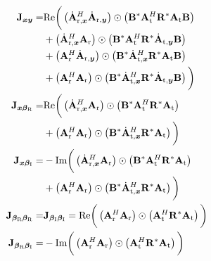 \documentclass[10pt,journal,twocolumn]{IEEEtran}
\begin{document}
\begin{subequations}\label{partial_derivative}
\begin{align}
\mathbf{J}_{\bm{x}\bm{y}}=&\text{Re}\bigg(\left(\dot{\mathbf{A}}^H_{\text{r},\bm{x}}\dot{\mathbf{A}}_{\text{r},\bm{y}}\right)\odot\left(\mathbf{B}^*\mathbf{A}^H_\text{t}\mathbf{R}^*\mathbf{A}_\text{t}\mathbf{B}\right)\notag\\
&+\left(\dot{\mathbf{A}}^H_{\text{r},\bm{x}}\mathbf{A}_{\text{r}}\right)\odot\left(\mathbf{B}^*\mathbf{A}^H_\text{t}\mathbf{R}^*\dot{\mathbf{A}}_{\text{t},\bm{y}}\mathbf{B}\right)\notag\\
&+\left(\mathbf{A}^H_{\text{r}}\dot{\mathbf{A}}_{\text{r},\bm{y}}\right)\odot\left(\mathbf{B}^*\dot{\mathbf{A}}^H_{\text{t},\bm{x}}\mathbf{R}^*\mathbf{A}_\text{t}\mathbf{B}\right)\notag\\
&+\left(\mathbf{A}^H_{\text{r}}\mathbf{A}_{\text{r}}\right)\odot\left(\mathbf{B}^*\dot{\mathbf{A}}^H_{\text{t},\bm{x}}\mathbf{R}^*\dot{\mathbf{A}}_{\text{t},\bm{y}}\mathbf{B}\right)\bigg)\\
\mathbf{J}_{\bm{x}\bm{\beta}_\text{R}}=&\text{Re}\bigg(\left(\dot{\mathbf{A}}^H_{\text{r},\bm{x}}\mathbf{A}_{\text{r}}\right)\odot\left(\mathbf{B}^*\mathbf{A}^H_\text{t}\mathbf{R}^*\mathbf{A}_{\text{t}}\right)\notag\\
&+\left(\mathbf{A}^H_{\text{r}}\mathbf{A}_{\text{r}}\right)\odot\left(\mathbf{B}^*\dot{\mathbf{A}}^H_{\text{t},\bm{x}}\mathbf{R}^*\mathbf{A}_{\text{t}}\right)\bigg)\\
\mathbf{J}_{\bm{x}\bm{\beta}_\text{I}}=&-\text{Im}\bigg(\left(\dot{\mathbf{A}}^H_{\text{r},\bm{x}}\mathbf{A}_{\text{r}}\right)\odot\left(\mathbf{B}^*\mathbf{A}^H_\text{t}\mathbf{R}^*\mathbf{A}_{\text{t}}\right)\notag\\
&+\left(\mathbf{A}^H_{\text{r}}\mathbf{A}_{\text{r}}\right)\odot\left(\mathbf{B}^*\dot{\mathbf{A}}^H_{\text{t},\bm{x}}\mathbf{R}^*\mathbf{A}_{\text{t}}\right)\bigg)\\
\mathbf{J}_{\bm{\beta}_\text{R}\bm{\beta}_\text{R}}=&\mathbf{J}_{\bm{\beta}_\text{I}\bm{\beta}_\text{I}} = \text{Re}\bigg(\left(\mathbf{A}^H_{\text{r}}\mathbf{A}_{\text{r}}\right)\odot\left(\mathbf{A}^H_{\text{t}}\mathbf{R}^*\mathbf{A}_{\text{t}}\right)\bigg)\\
\mathbf{J}_{\bm{\beta}_\text{R}\bm{\beta}_\text{I}}=&-\text{Im}\bigg(\left(\mathbf{A}^H_{\text{r}}\mathbf{A}_{\text{r}}\right)\odot\left(\mathbf{A}^H_{\text{t}}\mathbf{R}^*\mathbf{A}_{\text{t}}\right)\bigg)
\end{align}
\end{subequations}
\end{document}
